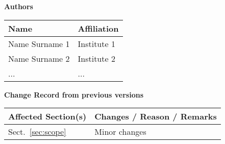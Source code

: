 \documentclass[12pt,a4paper]{article}
\begin{document}



\newpage
\pagestyle{fancy}

\noindent
{\Large \bf Authors}
\medskip

\noindent
\begin{tabularx}{\textwidth}{|l|X|}
  \hline
      {\bf Name} & {\bf Affiliation}\\
      \hline
      Name Surname 1     & Institute 1 \\ \hline
      Name Surname 2     & Institute 2 \\ \hline
      ...                & ...         \\ \hline
\end{tabularx}

\vspace{3cm}

\noindent
{\Large \bf Change Record from previous versions}
\medskip

\noindent
\begin{tabularx}{\textwidth}{|l|X|}
  \hline
      {\bf Affected Section(s)} & {\bf Changes / Reason / Remarks}\\  \hline
      Sect.~\ref{sec:scope}&  Minor changes \\ \hline
\end{tabularx}


\newpage
\tableofcontents \thispagestyle{fancy}


\newpage





\newpage
\listofreq \thispagestyle{fancy}

\listofquestion \thispagestyle{fancy}


\label{LastPage}
\end{document}
